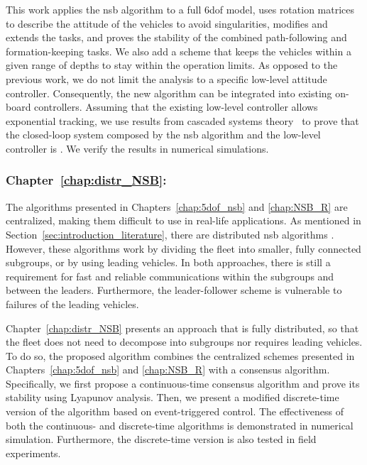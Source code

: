 This work applies the \gls{nsb} algorithm to a full 6\gls{dof} model, uses rotation matrices to describe the attitude of the vehicles to avoid singularities, modifies and extends the tasks, and proves the stability of the combined path-following and formation-keeping tasks.
We also add a scheme that keeps the vehicles within a given range of depths to stay within the operation limits.
As opposed to the previous work, we do not limit the analysis to a specific low-level attitude controller.
Consequently, the new algorithm can be integrated into existing on-board controllers.
Assuming that the existing low-level controller allows exponential tracking, we use results from cascaded systems theory~\cite{pettersen_lyapunov_2017} to prove that the closed-loop system composed by the \gls{nsb} algorithm and the low-level controller is .
We verify the results in numerical simulations.

\subsubsection{Chapter~\ref{chap:distr_NSB}: }

The algorithms presented in Chapters~\ref{chap:5dof_nsb} and \ref{chap:NSB_R} are centralized, making them difficult to use in real-life applications.
As mentioned in Section~\ref{sec:introduction_literature}, there are distributed \gls{nsb} algorithms \cite{ahmad_multirobot_2014,tan_coordinated_2022}.
However, these algorithms work by dividing the fleet into smaller, fully connected subgroups, or by using leading vehicles.
In both approaches, there is still a requirement for fast and reliable communications within the subgroups and between the leaders.
Furthermore, the leader-follower scheme is vulnerable to failures of the leading vehicles.

Chapter~\ref{chap:distr_NSB} presents an approach that is fully distributed, so that the fleet does not need to decompose into subgroups nor requires leading vehicles.
To do so, the proposed algorithm combines the centralized schemes presented in Chapters~\ref{chap:5dof_nsb} and \ref{chap:NSB_R} with a consensus algorithm.
Specifically, we first propose a continuous-time consensus algorithm and prove its stability using Lyapunov analysis.
Then, we present a modified discrete-time version of the algorithm based on event-triggered control.
The effectiveness of both the continuous- and discrete-time algorithms is demonstrated in numerical simulation.
Furthermore, the discrete-time version is also tested in field experiments.

